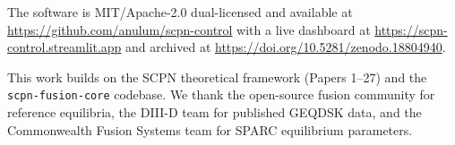 \documentclass[twocolumn,preprintnumbers,amsmath,amssymb,prl,floatfix]{revtex4-2}
\begin{document}
The software is MIT/Apache-2.0 dual-licensed and available at
\url{https://github.com/anulum/scpn-control} with a live
dashboard at \url{https://scpn-control.streamlit.app} and
archived at \url{https://doi.org/10.5281/zenodo.18804940}.

\begin{acknowledgments}
This work builds on the SCPN theoretical framework (Papers 1--27)
and the \texttt{scpn-fusion-core} codebase.
We thank the open-source fusion community for reference equilibria,
the DIII-D team for published GEQDSK data, and the Commonwealth
Fusion Systems team for SPARC equilibrium parameters.
\end{acknowledgments}



\end{document}
